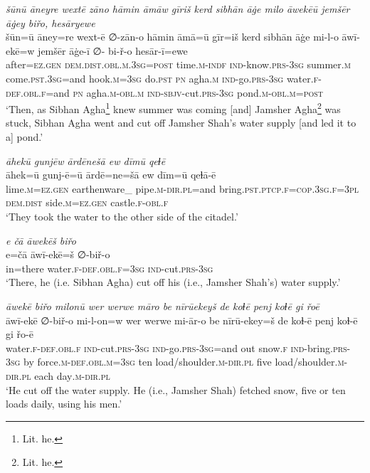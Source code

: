 \ea \label{DP.30}
\textit{šūnū āneyre wextē zāno hāmin āmāw gīriš kerd sibhān āġe milo āwekēū jemšēr āġey biřo, hesāryewe} \\ 
\gll šūn=ū āney=re wext-ē ∅-zān-o hāmin āmā=ū gīr=iš kerd sibhān āġe mi-l-o āwī-ekē=w jemšēr āġe-ī ∅- bi-ř-o hesār-ī=ewe \\ 
 after\textsc{=ez}\textsc{.gen} \textsc{dem.dist}\textsc{.obl}\textsc{.m}\textsc{.3sg}\textsc{=\textsc{post}} time\textsc{.m}\textsc{-indf} \textsc{ind-}know\textsc{.prs}\textsc{-3sg} summer\textsc{.m} come\textsc{.pst}\textsc{.3sg}=and hook\textsc{.m}\textsc{=3sg} do\textsc{.pst} \textsc{pn} agha\textsc{.m} \textsc{ind-}go\textsc{.prs}\textsc{-3sg} water\textsc{\textsc{.f}}\textsc{-def}\textsc{.obl}\textsc{\textsc{.f}}=and \textsc{pn} agha\textsc{.m}\textsc{-obl}\textsc{.m} \textsc{ind-}\textsc{sbjv-}cut\textsc{.prs}\textsc{-3sg} pond\textsc{.m}\textsc{-obl}\textsc{.m}\textsc{=\textsc{post}} \\ 
\glt `Then, as Sibhan Agha\footnote{Lit. he.} knew summer was coming [and] Jamsher Agha\footnote{Lit. he.} was stuck, Sibhan Agha went and cut off Jamsher Shah’s water supply [and led it to a] pond.'
\z 
 
\ea \label{DP.32}
\textit{āhekū gunjēw ārdēnešā ew dīmū qeɫē} \\ 
\gll āhek=ū gunj-ē=ū ārdē=ne=šā ew dīm=ū qeɫā-ē \\ 
 lime\textsc{.m}\textsc{=ez}\textsc{.gen} earthenware\_ pipe\textsc{.m}\textsc{-dir}\textsc{.pl}=and bring\textsc{.pst}\textsc{.ptcp}\textsc{\textsc{.f}}\textsc{=cop}\textsc{.3sg}\textsc{\textsc{.f}}\textsc{=3pl} \textsc{dem.dist} side\textsc{.m}\textsc{=ez}\textsc{.gen} castle\textsc{\textsc{.f}}\textsc{-obl}\textsc{\textsc{.f}} \\ 
\glt `They took the water to the other side of the citadel.'
\z 
 
\ea \label{DP.33}
\textit{e čā āwekēš biřo} \\ 
\gll e=čā āwī-ekē=š ∅-biř-o \\ 
 in=there water\textsc{\textsc{.f}}\textsc{-def}\textsc{.obl}\textsc{\textsc{.f}}\textsc{=3sg} \textsc{ind-}cut\textsc{.prs}\textsc{-3sg} \\ 
\glt `There, he (i.e. Sibhan Agha) cut off his (i.e., Jamsher Shah’s) water supply.'
\z 
 
\ea \label{DP.34}
\textit{āwekē biřo milonū wer werwe māro be nīrūekeyš de koɫē penj koɫē gi řoē} \\ 
\gll āwī-ekē ∅-biř-o mi-l-on=w wer werwe mi-ār-o be nīrū-ekey=š de koɫ-ē penj koɫ-ē gi řo-ē \\ 
 water\textsc{\textsc{.f}}\textsc{-def}\textsc{.obl}\textsc{\textsc{.f}} \textsc{ind-}cut\textsc{.prs}\textsc{-3sg} \textsc{ind-}go\textsc{.prs}\textsc{-3sg}=and out snow\textsc{\textsc{.f}} \textsc{ind-}bring\textsc{.prs}\textsc{-3sg} by force\textsc{.m}\textsc{-def}\textsc{.obl}\textsc{.m}\textsc{=3sg} ten load/shoulder\textsc{.m}\textsc{-dir}\textsc{.pl} five load/shoulder\textsc{.m}\textsc{-dir}\textsc{.pl} each day\textsc{.m}\textsc{-dir}\textsc{.pl} \\ 
\glt `He cut off the water supply. He (i.e., Jamsher Shah) fetched snow, five or ten loads daily, using his men.'
\z 
 
